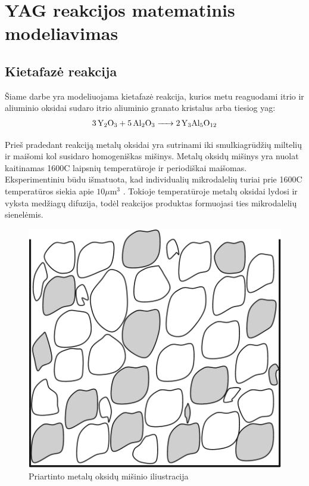 
\section{YAG reakcijos matematinis modeliavimas}

% 



\subsection{Kietafazė reakcija}

Šiame darbe yra modeliuojama kietafazė reakcija, kurios metu reaguodami itrio ir aliuminio oksidai sudaro itrio aliuminio granato kristalus arba tiesiog \acs{yag}:
\begin{align*}
  \ce{3Y_2O_3 + 5Al_2O_3 -> 2Y_3Al_5O_12}
\end{align*}

Prieš pradedant reakciją metalų oksidai yra sutrinami iki smulkiagrūdžių miltelių ir maišomi kol susidaro homogeniškas mišinys. Metalų oksidų mišinys yra nuolat kaitinamas 1600\degree C laipsnių temperatūroje ir periodiškai maišomas. Eksperimentiniu būdu išmatuota, kad individualių mikrodalelių turiai prie 1600\degree C temperatūros siekia apie $10\mu\text{m}^3$ \cite{ivanauskasComputationalModellingYAG2009}. Tokioje temperatūroje metalų oksidai lydosi ir vyksta medžiagų difuzija, todėl reakcijos produktas formuojasi ties mikrodalelių sienelėmis.

\begin{figure}[h]
  \centering
  \includegraphics[width=0.25\linewidth]{assets/metal_oxides_mixture.png}
  \caption{Priartinto metalų oksidų mišinio iliustracija}
  \label{fig:metal-oxides-mixuter}
\end{figure}

